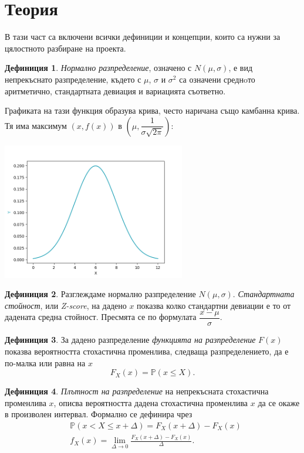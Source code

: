 \documentclass[11pt, a4paper]{article}
\theoremstyle{definition}
\newtheorem{definition}{Дефиниция}
\begin{document}
\section{Теория}
	В тази част са включени всички дефиниции и концепции, които са нужни за цялостното разбиране на проекта.
		\begin{definition}
			\label{def:normdist}
			\emph{Нормално разпределение}, означено  с $N(\mu, \sigma)$, е вид непрекъснато разпределение, където с $\mu$, $\sigma$ и $\sigma^{2}$ са означени среднoто аритметично, стандартната девиация и вариацията съответно.
		\end{definition}
	
		Графиката на тази функция образува крива, често наричана също камбанна крива. Тя има максимум $(x,f(x))$ в $\left(\mu, \dfrac{1}{\sigma\sqrt{2\pi}}\right)$:
		\begin{center}
			\includegraphics[width=0.6\textwidth]{Normal_clean}
		\end{center}
		
		\begin{definition}
			\label{def:def2}
			Разглеждаме нормално разпределение $N(\mu, \sigma)$. \emph{Стандартната стойност}, или \emph{Z-score}, на дадено $x$ показва колко стандартни девиации е то от дадената средна стойност. Пресмята се по формулата $\dfrac{x-\mu}{\sigma}$.
		\end{definition}
	
		\begin{definition}
			\label{def:prob_dist}
			За дадено разпределение \emph{функцията на разпределение} $F(x)$ показва вероятността стохастична променлива, следваща разпределението, да е по-малка или равна на $x$
			$$F_{X}(x)=\mathbb{P}(x\leq X).$$
		\end{definition}
	
		\begin{definition}
			\label{def:prob_dens}
			\emph{Плътност на разпределение} на непрекъсната стохастична променлива $x$, описва вероятността дадена стохастична променлива $x$ да се окаже в произволен интервал. Формално се дефинира чрез
			\begin{align*}
				&\mathbb{P}(x < X \leq x+\Delta)=F_X(x+\Delta)-F_X(x)\\
				&f_X(x)=\lim_{\Delta \rightarrow 0} \frac{F_X(x+\Delta)-F_X(x)}{\Delta}.		
			\end{align*}
		\end{definition}
	
\end{document}
